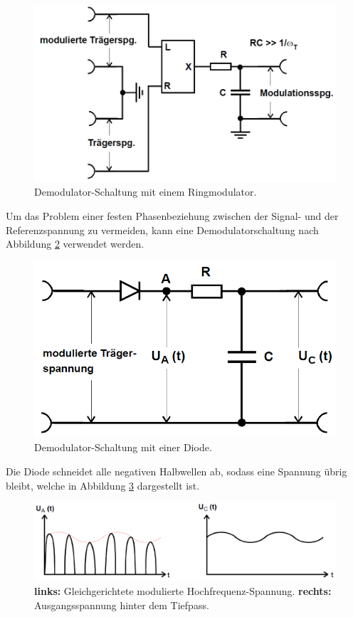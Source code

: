 \begin{figure}[!h]
    \centering
    \includegraphics[width = 14cm]{images/adm_ringmodulator.png}
    \caption{Demodulator-Schaltung mit einem Ringmodulator.}
    \label{adm:ringmodulator}
\end{figure}

Um das Problem einer festen Phasenbeziehung zwischen der Signal- und der Referenzspannung zu vermeiden, kann eine Demodulatorschaltung nach Abbildung \ref{adm:diode} verwendet werden.

\begin{figure}[!h]
    \centering
    \includegraphics[width = 14cm]{images/adm_diode.png}
    \caption{Demodulator-Schaltung mit einer Diode.}
    \label{adm:diode}
\end{figure}

Die Diode schneidet alle negativen Halbwellen ab, sodass eine Spannung übrig bleibt, welche in Abbildung \ref{adm:spannung} dargestellt ist.

\begin{figure}[!h]
    \centering
    \includegraphics[width = 14cm]{images/adm_spannung.png}
    \caption{\textbf{links:} Gleichgerichtete modulierte Hochfrequenz-Spannung. \textbf{rechts:} Ausgangsspannung hinter dem Tiefpass.}
    \label{adm:spannung}
\end{figure}

